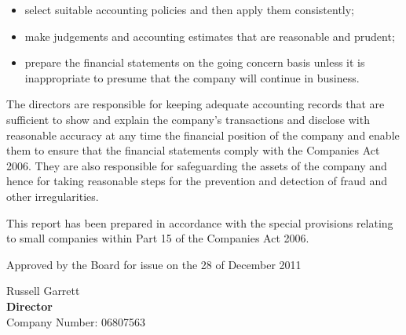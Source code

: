 \begin{itemize}
    \item select suitable accounting policies and then apply them consistently;
    \item make judgements and accounting estimates that are reasonable and prudent;
    \item prepare the financial statements on the going concern basis unless it is inappropriate to presume that the company will continue in business.
\end{itemize}

The directors are responsible for keeping adequate accounting records that are sufficient to show and explain the company's transactions and disclose with reasonable accuracy at any time the financial position of the company and enable them to ensure that the financial statements comply with the Companies Act 2006. They are also responsible for safeguarding the assets of the company and hence for taking reasonable steps for the prevention and detection of fraud and other irregularities.

This report has been prepared in accordance with the special provisions relating to small companies within Part 15 of the Companies Act 2006.

Approved by the Board for issue on the 28 of December 2011
\vspace{48pt}

Russell Garrett \\
{\bf Director} \\
Company Number: 06807563
